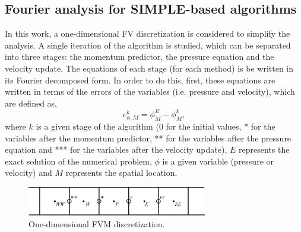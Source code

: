 \documentclass[final,3p,times,11pt,onecolumn]{myElsarticle}
\numberwithin{equation}{section}
\begin{document}
\subsection{Fourier analysis for SIMPLE-based algorithms}

In this work, a one-dimensional FV discretization is considered to simplify the analysis. A single iteration of the algorithm is studied, which can be separated into three stages: the momentum predictor, the pressure equation and the velocity update. The equations of each stage (for each method) is be written in its Fourier decomposed form. In order to do this, first, these equations are written in terms of the errors of the variables (i.e. pressure and velocity), which are defined as,
\begin{equation}
    e^k_{\phi,M} = \phi^{E}_{M}-\phi_M^{k},
\end{equation}
where $k$ is a given stage of the algorithm ($0$ for the initial values, * for the variables after the momentum predictor, ** for the variables after the pressure equation and *** for the variables after the velocity update), $E$ represents the exact solution of the numerical problem, $\phi$ is a given variable (pressure or velocity) and $M$ represents the spatial location.
\begin{figure}[t!]
    \centering
    \includegraphics[width=0.7\textwidth]{fig/cells2.eps}
    \caption{One-dimensional FVM discretization.}
    \label{fig:4a}
\end{figure}
\end{document}
